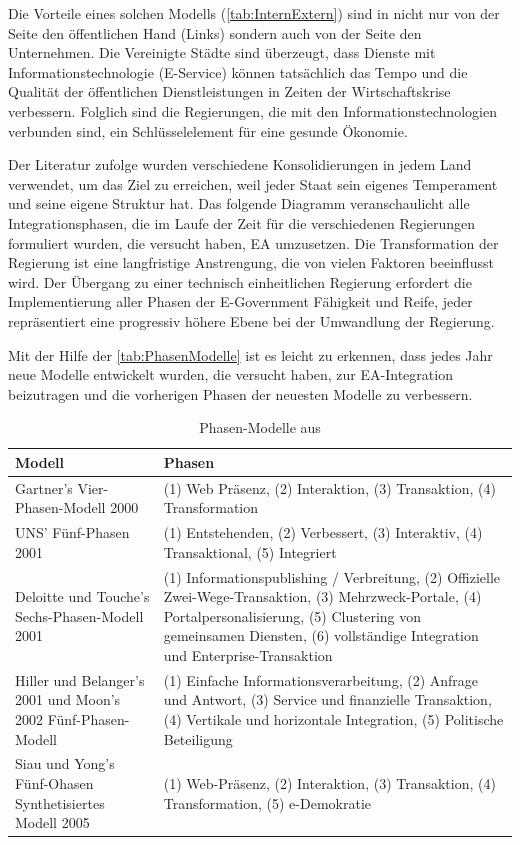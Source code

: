 \documentclass[
	doc,
	a4paper,
	helv
	]{apa6}
\begin{document}
Die Vorteile eines solchen Modells (\autoref{tab:InternExtern}) sind in  nicht nur von der Seite den öffentlichen Hand (Links) sondern auch von der Seite den Unternehmen. Die Vereinigte Städte sind überzeugt, dass  Dienste mit Informationstechnologie (E-Service) können tatsächlich das Tempo und die Qualität der öffentlichen Dienstleistungen in Zeiten der Wirtschaftskrise verbessern. Folglich sind die Regierungen, die mit den Informationstechnologien verbunden sind, ein Schlüsselelement für eine gesunde Ökonomie.

Der Literatur zufolge wurden verschiedene Konsolidierungen in jedem Land verwendet, um das Ziel zu erreichen, weil jeder Staat  sein eigenes Temperament und seine eigene Struktur hat. Das folgende Diagramm veranschaulicht alle Integrationsphasen, die im Laufe der Zeit für die verschiedenen Regierungen formuliert wurden, die versucht haben, EA umzusetzen. Die Transformation der Regierung ist eine langfristige Anstrengung, die von vielen Faktoren beeinflusst wird. Der Übergang zu einer technisch einheitlichen Regierung erfordert die Implementierung aller Phasen der E-Government Fähigkeit und Reife, jeder repräsentiert eine progressiv höhere Ebene bei der Umwandlung der Regierung.

Mit der Hilfe der \autoref{tab:PhasenModelle} ist es leicht zu erkennen, dass jedes Jahr neue Modelle entwickelt wurden, die versucht haben, zur EA-Integration beizutragen und die vorherigen Phasen der neuesten Modelle zu verbessern.

\begin{table}[!htbp]
\caption{Phasen-Modelle aus \textcite{Napitupulu2016}}
\begin{center}
\begin{tabularx}{\textwidth}{|X|X|}
\hline
Modell & Phasen \\\hline
Gartner's Vier-Phasen-Modell 2000
&
(1) Web Präsenz,
(2) Interaktion,
(3) Transaktion,
(4) Transformation
\\\hline
UNS' Fünf-Phasen 2001
&
(1) Entstehenden,
(2) Verbessert,
(3) Interaktiv,
(4) Transaktional,
(5) Integriert
\\\hline
Deloitte und Touche's Sechs-Phasen-Modell 2001
&
(1) Informationspublishing / Verbreitung,
(2) Offizielle Zwei-Wege-Transaktion,
(3) Mehrzweck-Portale,
(4) Portalpersonalisierung,
(5) Clustering von gemeinsamen Diensten,
(6) vollständige Integration und Enterprise-Transaktion
\\\hline
Hiller und Belanger's 2001 und Moon's 2002 Fünf-Phasen-Modell
&
(1) Einfache Informationsverarbeitung,
(2) Anfrage und Antwort,
(3) Service und finanzielle Transaktion,
(4) Vertikale und horizontale Integration,
(5) Politische Beteiligung
\\\hline
Siau und Yong's Fünf-Ohasen Synthetisiertes Modell 2005
&
(1) Web-Präsenz,
(2) Interaktion,
(3) Transaktion,
(4) Transformation,
(5) e-Demokratie
\\\hline
\end{tabularx}
\end{center}
\label{tab:PhasenModelle}
\end{table}
\end{document}

